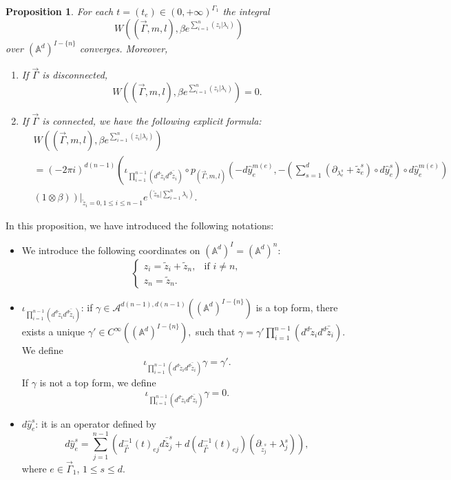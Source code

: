 \documentclass[11pt]{amsart}
\newtheorem{prop}[thm]{Proposition}
\theoremstyle{definition}
\theoremstyle{remark}
\numberwithin{equation}{section}
\begin{document}
\begin{prop}\label{explicit formula}
  For each $t = (t_{e})\in(0,+\infty)^{\Gamma_1}$ the integral
    $$
    W((\vec{\Gamma},m,l),\beta e^{\sum\limits_{i=1}^{n}(z_{i}|\lambda_{i})})
    $$
    over $(\mathbb{A}^d)^{I-\{n\}}$ converges.
    Moreover,
    \begin{enumerate}
        \item If $\vec{\Gamma}$ is disconnected,
        $$
        W((\vec{\Gamma},m,l),\beta e^{\sum\limits_{i=1}^{n}(z_{i}|\lambda_{i})})=0.
        $$
        \item If $\vec{\Gamma}$ is connected, we have the following explicit formula:
        \begin{align*}
            &W((\vec{\Gamma},m,l),\beta e^{\sum\limits_{i=1}^{n}(z_{i}|\lambda_{i})})\\
            &=(-2\pi i)^{d(n-1)}\left(
        \iota_{\prod_{i=1}^{n-1}(d^{d}\tilde{z}_{i}d^{d}\bar{\tilde{z}}_{i})}\circ p_{(\vec{\Gamma},m,l)}(-d\hat{y}_{e}^{m(e)},-(\sum_{s=1}^{d}(\partial_{\lambda_{e}^{s}}+\tilde{z}_{e}^{s})\circ d\hat{y}_{e}^{s})\circ d\hat{y}_{e}^{m(e)})
        \right.\\
        &\left.\left.(1\otimes \beta)\right)\right|_{\tilde{z}_{i}=0,1\leq i\leq n-1} e^{(\tilde{z}_{n}|\sum\limits_{i=1}^{n}\lambda_{i})}.
        \end{align*}
    \end{enumerate}
  \end{prop}
  In this proposition, we have introduced the following notations:
    \begin{itemize}
      \item We introduce the following coordinates on $(\mathbb{A}^{d})^{ I}=(\mathbb{A}^d)^n$:
$$
\begin{cases}
    z_{i}=\tilde{z}_{i}+\tilde{z}_{n}, &\text{if }i\neq n,\\
    z_{n}=\tilde{z}_{n}.
\end{cases}
$$
        \item $\iota_{\prod_{i=1}^{n-1}(d^{d}\tilde{z}_{i}d^{d}\bar{\tilde{z}}_{i})}$: if $
        \gamma\in \mathcal{A}^{d(n-1),d(n-1)}((\mathbb{A}^d)^{ I-\{n\}})
        $ is a top form, there exists a unique
        $
        \gamma'\in C^{\infty}((\mathbb{A}^d)^{ I-\{n\}}),
        $
        such that
        $
        \gamma=\gamma'\prod_{i=1}^{n-1}(d^{d}\tilde{z}_{i}d^{d}\bar{\tilde{z}}_{i}).
        $
        We define
        $$
        \iota_{\prod_{i=1}^{n-1}(d^{d}\tilde{z}_{i}d^{d}\bar{\tilde{z}}_{i})}\gamma=\gamma'.
        $$
        If $\gamma$ is not a top form, we define
        $$
        \iota_{\prod_{i=1}^{n-1}(d^{d}\tilde{z}_{i}d^{d}\bar{\tilde{z}}_{i})}\gamma=0.
        $$
        \item $d\hat{y}_{e}^{s}$: it is an operator defined by
        $$
        d\hat{y}_{e}^{s}=\sum_{j=1}^{n-1}\left(d^{-1}_{\vec{\Gamma}}(t)_{ej}d\bar{\tilde{z}}_{j}^{s}+d(d^{-1}_{\vec{\Gamma}}(t)_{ej})(\partial_{\tilde{z}_{j}^{s}}+\lambda_{j}^{s})\right),
        $$
        where $e\in \vec{\Gamma}_{1}$, $1\leq s\leq d$.
    \end{itemize}
\end{document}
